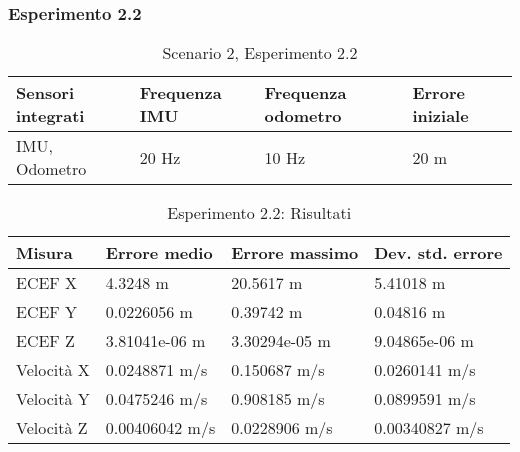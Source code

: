 \subsubsection{Esperimento 2.2}
\begin{table}[h]
	\centering
	\begin{tabular}{|p{3.2cm}|p{2.75cm}|p{2.75cm}|p{2.75cm}|}
		\hline 
		\textbf{Sensori integrati} & \textbf{Frequenza IMU}  & \textbf{Frequenza odometro} & \textbf{Errore iniziale} \\ 
		\hline 
		IMU, Odometro & 20 Hz & 10 Hz & 20 m \\ 
		\hline 
	\end{tabular}
	\caption{Scenario 2, Esperimento 2.2}
\end{table}
\begin{table}[h]
	\centering
	\begin{tabular}{|p{2cm}|p{3.2cm}|p{3cm}|p{3cm}|}
		\hline 
		\textbf{Misura} 
		& \textbf{Errore medio} 
		& \textbf{Errore massimo}
		& \textbf{Dev. std. errore}\\ 
		\hline 
		ECEF X & 4.3248 m & 20.5617 m & 5.41018 m \\ 
		\hline 
		ECEF Y & 0.0226056 m & 0.39742 m & 0.04816 m \\ 
		\hline 
		ECEF Z & 3.81041e-06 m & 3.30294e-05 m & 9.04865e-06 m \\ 
		\hline 
		Velocit\`a X & 0.0248871 m/s & 0.150687 m/s & 0.0260141 m/s \\ 
		\hline 
		Velocit\`a Y & 0.0475246 m/s & 0.908185 m/s & 0.0899591 m/s \\ 
		\hline 
		Velocit\`a Z & 0.00406042 m/s & 0.0228906 m/s & 0.00340827 m/s \\ 
		\hline 
	\end{tabular} 
	\caption{Esperimento 2.2: Risultati}
\end{table}

